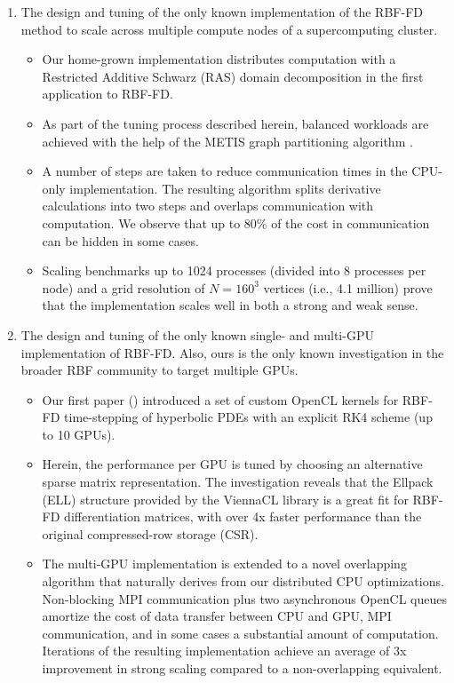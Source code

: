 \documentclass[11pt]{report}
\begin{document}
\begin{enumerate}
\begin{itemize}
\end{itemize} 
\item The design and tuning of the only known implementation of the RBF-FD method to scale across multiple compute nodes of a supercomputing cluster.
\begin{itemize} 
\item Our home-grown implementation distributes computation with a Restricted Additive Schwarz (RAS) domain decomposition in the first application to RBF-FD. %
\item As part of the tuning process described herein, balanced workloads are achieved with the help of the METIS graph partitioning algorithm \cite{Karypis1999}.  
\item A number of steps are taken to reduce communication times in the CPU-only implementation. The resulting algorithm splits derivative calculations into two steps and overlaps communication with computation. We observe that up to 80\% of the cost in communication can be hidden in some cases. 
\item Scaling benchmarks up to 1024 processes (divided into 8 processes per node) and a grid resolution of $N=160^3$ vertices (i.e., 4.1 million) prove that the implementation scales well in both a strong and weak sense. 
\end{itemize} 
\item The design and tuning of the only known single- and multi-GPU implementation of RBF-FD. Also, ours is the only known investigation in the broader RBF community to target multiple GPUs. 
\begin{itemize} 
\item Our first paper (\cite{BolligFlyerErlebacher2012}) introduced a set of custom OpenCL kernels for RBF-FD time-stepping of hyperbolic PDEs with an explicit RK4 scheme (up to 10 GPUs). 
\item Herein, the performance per GPU is tuned by choosing an alternative sparse matrix representation. The investigation reveals that the Ellpack (ELL) structure provided by the ViennaCL library \cite{Rupp2010} is a great fit for RBF-FD differentiation matrices, with over 4x faster performance than the original compressed-row storage (CSR). %
\item The multi-GPU implementation is extended to a novel overlapping algorithm that naturally derives from our distributed CPU optimizations. Non-blocking MPI communication plus two asynchronous OpenCL queues amortize the cost of data transfer between CPU and GPU, MPI communication, and in some cases a substantial amount of computation. Iterations of the resulting implementation achieve an average of 3x improvement in strong scaling compared to a non-overlapping equivalent. 
\end{itemize} 
\end{enumerate}
\end{document}
